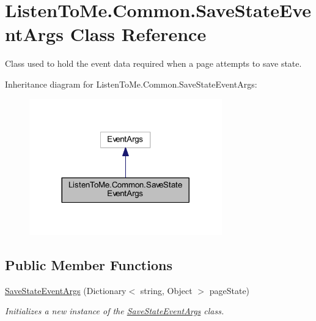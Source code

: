 \hypertarget{class_listen_to_me_1_1_common_1_1_save_state_event_args}{}\section{Listen\+To\+Me.\+Common.\+Save\+State\+Event\+Args Class Reference}
\label{class_listen_to_me_1_1_common_1_1_save_state_event_args}


Class used to hold the event data required when a page attempts to save state.  




Inheritance diagram for Listen\+To\+Me.\+Common.\+Save\+State\+Event\+Args\+:\nopagebreak
\begin{figure}[H]
\begin{center}
\leavevmode
\includegraphics[width=236pt]{class_listen_to_me_1_1_common_1_1_save_state_event_args__inherit__graph}
\end{center}
\end{figure}
\subsection*{Public Member Functions}
\begin{DoxyCompactItemize}
\item 
\hyperlink{class_listen_to_me_1_1_common_1_1_save_state_event_args_a73b5192276a1daa51a69d042b5e9b977}{Save\+State\+Event\+Args} (Dictionary$<$ string, Object $>$ page\+State)
\begin{DoxyCompactList}\small\item\em Initializes a new instance of the \hyperlink{class_listen_to_me_1_1_common_1_1_save_state_event_args}{Save\+State\+Event\+Args} class. \end{DoxyCompactList}\end{DoxyCompactItemize}
